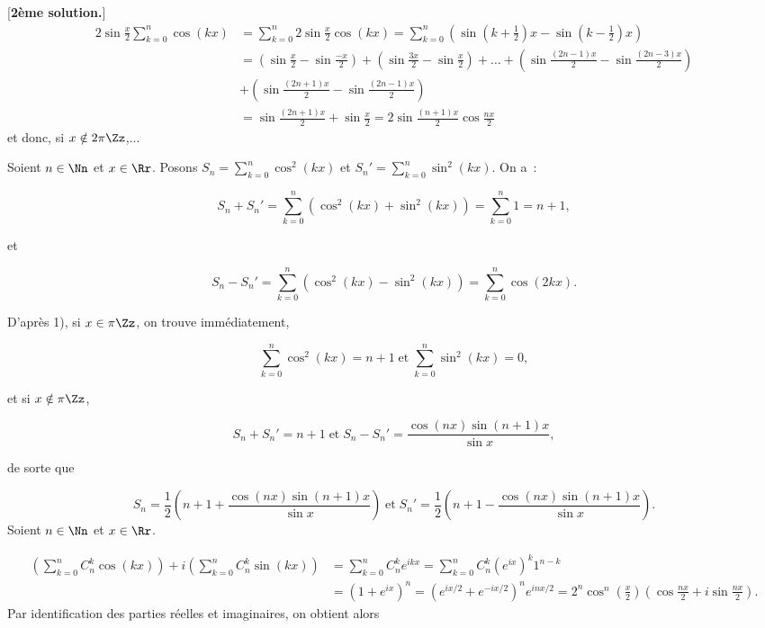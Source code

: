 {\begin{enumerate}
{\begin{itemize}
\begin{itemize}
\end{itemize}
[\textbf{2ème solution.}]
\begin{align*}
2\sin\frac{x}{2}\sum_{k=0}^{n}\cos(kx)&=\sum_{k=0}^{n}2\sin\frac{x}{2}\cos(kx)=\sum_{k=0}^{n}(\sin(k+\frac{1}{2})x-\sin(
k-\frac{1}{2})x)\\
 &=\left(\sin\frac{x}{2}-\sin\frac{-x}{2}\right)+\left(\sin\frac{3x}{2}-\sin\frac{x}{2}\right)+\ldots+\left(\sin\frac{(2n-1)x}{2}-\sin\frac{(2n-3)x}{2}\right)\\
  &+\left(\sin\frac{(2n+1)x}{2}-\sin\frac{(2n-1)x}{2}\right)\\
 &=\sin\frac{(2n+1)x}{2}+\sin\frac{x}{2}=2\sin\frac{(n+1)x}{2}\cos\frac{nx}{2}
\end{align*}
et donc, si $x\notin2\pi\Zz$,...

\end{itemize}
Soient $n\in\Nn$ et $x\in\Rr$. Posons $S_n=\sum_{k=0}^{n}\cos^2(kx)$ et $S_n'=\sum_{k=0}^{n}\sin^2(kx)$. On
a~:

$$S_n+S_n'=\sum_{k=0}^{n}(\cos^2(kx)+\sin^2(kx))=\sum_{k=0}^{n}1=n+1,$$

et

$$S_n-S_n'=\sum_{k=0}^{n}(\cos^2(kx)-\sin^2(kx))=\sum_{k=0}^{n}\cos(2kx).$$

D'après 1), si $x\in\pi\Zz$, on trouve immédiatement,

$$\sum_{k=0}^{n}\cos^2(kx)=n+1\;\mbox{et}\;\sum_{k=0}^{n}\sin^2(kx)=0,$$

et si $x\notin\pi\Zz$,

$$S_n+S_n'=n+1\;\mbox{et}\;S_n-S_n'=\frac{\cos(nx)\sin(n+1)x}{\sin x},$$

de sorte que

$$S_n=\frac{1}{2}\left(n+1+\frac{\cos(nx)\sin(n+1)x}{\sin
x}\right)\;\mbox{et}\;S_n'=\frac{1}{2}\left(n+1-\frac{\cos(nx)\sin(n+1)x}{\sin x}\right).$$
Soient $n\in\Nn$ et $x\in\Rr$.

\begin{align*}
\left(\sum_{k=0}^{n}C_n^k\cos(kx)\right)+i\left(\sum_{k=0}^{n}C_n^k\sin(kx)\right)&=\sum_{k=0}^{n}C_n^ke^{ikx}
=\sum_{k=0}^{n}C_n^k(e^{ix})^k1^{n-k}\\
 &=(1+e^{ix})^n=(e^{ix/2}+e^{-ix/2})^ne^{inx/2}=2^n\cos^n\left(\frac{x}{2}\right)\left(\cos\frac{nx}{2}+i\sin\frac{nx}{2}\right).
\end{align*}
Par identification des parties réelles et imaginaires, on obtient alors

\begin{center}
\end{center}
}
\end{enumerate}
}
